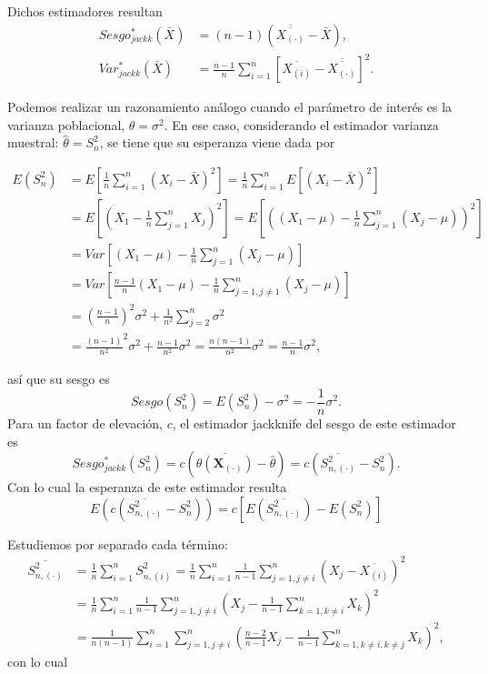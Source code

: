 \documentclass[
]{book}
\theoremstyle{break}
\theoremstyle{definition}
\theoremstyle{definition}
\theoremstyle{definition}
\theoremstyle{definition}
\theoremstyle{remark}
\begin{document}
Dichos estimadores resultan\[\begin{aligned}
Sesgo_{jackk}^{\ast}\left( \bar{X} \right) &= \left( n-1 \right) \left( 
\overline{\overline{X_{(\cdot)}}}-\bar{X} \right), \\
Var_{jackk}^{\ast}\left( \bar{X} \right) &= \frac{n-1}{n}\sum_{i=1}^{n}
\left[ \overline{X_{(i)}}-\overline{\overline{X_{\left( \cdot
 \right)}}}\right]^2.\end{aligned}\]

Podemos realizar un razonamiento análogo cuando el parámetro de interés
es la varianza poblacional, \(\theta =\sigma^2\). En ese caso,
considerando el estimador varianza muestral: \(\hat{\theta}=S_n^2\),
se tiene que su esperanza viene dada por

\[\begin{aligned}
E\left( S_n^2 \right) &= E\left[ \frac{1}{n}\sum_{i=1}^{n}\left( X_i-
\bar{X} \right)^2\right] =\frac{1}{n}\sum_{i=1}^{n}E\left[ \left(
X_i-\bar{X} \right)^2\right] \\
&= E\left[ \left( X_1-\frac{1}{n}\sum_{j=1}^{n}X_j \right)^2\right] =E
\left[ \left( \left( X_1-\mu \right) -\frac{1}{n}\sum_{j=1}^{n}\left(
X_j-\mu \right) \right)^2\right] \\
&= Var\left[ \left( X_1-\mu \right) -\frac{1}{n}\sum_{j=1}^{n}\left(
X_j-\mu \right) \right] \\
&= Var\left[ \frac{n-1}{n}\left( X_1-\mu \right) -\frac{1}{n}
\sum_{j=1,j\neq 1}^{n}\left( X_j-\mu \right) \right] \\
&= \left( \frac{n-1}{n} \right)^2\sigma^2+\frac{1}{n^2}
\sum_{j=2}^{n}\sigma^2 \\
&= \frac{\left( n-1 \right)}{n^2}^2\sigma^2+\frac{n-1}{n^2}\sigma
^2=\frac{n\left( n-1 \right)}{n^2}\sigma^2=\frac{n-1}{n}\sigma^2,\end{aligned}\]

así que su sesgo es
\[Sesgo\left( S_n^2 \right) =E\left( S_n^2 \right) -\sigma^2=-\frac{1
}{n}\sigma^2.\]Para un factor de elevación, \(c\), el estimador
jackknife del sesgo de este estimador
es\[Sesgo_{jackk}^{\ast}\left( S_n^2 \right) =c\left( \overline{\theta
\left( \mathbf{X}_{(\cdot)} \right)}-\hat{\theta}
 \right) =c\left( \overline{S_{n,(\cdot)}^2}-S_n^2 \right)
.\]Con lo cual la esperanza de este estimador resulta
\[E\left( c\left( \overline{S_{n,(\cdot)}^2}-S_n^2 \right)
 \right) =c\left[ E\left( \overline{S_{n,(\cdot)}^2} \right)
-E\left( S_n^2 \right) \right]\]

Estudiemos por separado cada término:
\[\begin{aligned}
\overline{S_{n,(\cdot)}^2} &= \frac{1}{n}\sum_{i=1}^{n}S_{n,
(i)}^2=\frac{1}{n}\sum_{i=1}^{n}\frac{1}{n-1}\sum_{j=1,j\neq
i}^{n}\left( X_j-\overline{X_{(i)}} \right)^2 \\
&= \frac{1}{n}\sum_{i=1}^{n}\frac{1}{n-1}\sum_{j=1,j\neq i}^{n}\left( X_j-
\frac{1}{n-1}\sum_{k=1,k\neq i}^{n}X_{k} \right)^2 \\
&= \frac{1}{n\left( n-1 \right)}\sum_{i=1}^{n}\sum_{j=1,j\neq i}^{n}\left( 
\frac{n-2}{n-1}X_j-\frac{1}{n-1}\sum_{k=1,k\neq i,k\neq j}^{n}X_{k} \right)^2,
\end{aligned}\]
con lo cual
\end{document}
